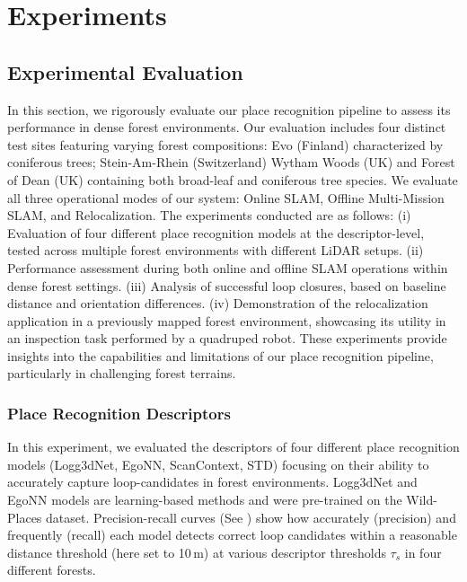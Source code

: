 \chapter{Experiments}
\label{chapter:experiments} 


\section{Experimental Evaluation}\label{sec:exp}
In this section, we rigorously evaluate our place recognition pipeline to assess its performance in dense forest environments. Our evaluation includes four distinct test sites featuring varying forest compositions: Evo (Finland) characterized by coniferous trees; Stein-Am-Rhein (Switzerland) Wytham Woods (UK) and Forest of Dean (UK) containing both broad-leaf and coniferous tree species. We evaluate all three operational modes of our system: Online SLAM, Offline Multi-Mission SLAM, and Relocalization.
The experiments conducted are as follows:
(i) Evaluation of four different place recognition models at the descriptor-level, tested across multiple forest environments with different LiDAR setups.
(ii) Performance assessment during both online and offline SLAM operations within dense forest settings. 
(iii) Analysis of successful loop closures, based on baseline distance and orientation differences.
(iv) Demonstration of the relocalization application in a previously mapped forest environment, showcasing its utility in an inspection task performed by a quadruped robot. 
These experiments provide insights into the capabilities and limitations of our place recognition pipeline, particularly in challenging forest terrains.


\subsection{Place Recognition Descriptors}
\label{sec:exp_desc_analysis} 
In this experiment, we evaluated the descriptors of four different place recognition models (Logg3dNet, EgoNN, ScanContext, STD) focusing on their ability to accurately capture loop-candidates in forest environments. Logg3dNet and EgoNN models are learning-based methods and were pre-trained on the Wild-Places dataset. Precision-recall curves (See ) show how accurately (precision) and frequently (recall) each  model detects correct loop candidates within a reasonable distance threshold (here set to 10\,m) at various descriptor thresholds $\tau_{s}$ in four different forests.  

